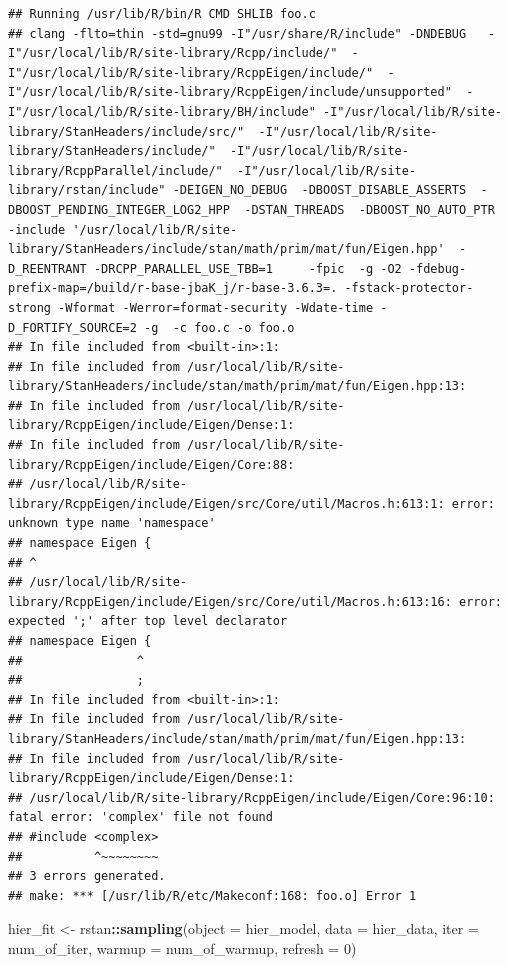 \documentclass[
]{article}
\newenvironment{Shaded}{\begin{snugshade}}{\end{snugshade}}
\newcommand{\DataTypeTok}[1]{\textcolor[rgb]{0.13,0.29,0.53}{#1}}
\newcommand{\DecValTok}[1]{\textcolor[rgb]{0.00,0.00,0.81}{#1}}
\newcommand{\KeywordTok}[1]{\textcolor[rgb]{0.13,0.29,0.53}{\textbf{#1}}}
\newcommand{\NormalTok}[1]{#1}
\newcommand{\OperatorTok}[1]{\textcolor[rgb]{0.81,0.36,0.00}{\textbf{#1}}}
\newcommand{\StringTok}[1]{\textcolor[rgb]{0.31,0.60,0.02}{#1}}
\begin{document}
\begin{verbatim}
## Running /usr/lib/R/bin/R CMD SHLIB foo.c
## clang -flto=thin -std=gnu99 -I"/usr/share/R/include" -DNDEBUG   -I"/usr/local/lib/R/site-library/Rcpp/include/"  -I"/usr/local/lib/R/site-library/RcppEigen/include/"  -I"/usr/local/lib/R/site-library/RcppEigen/include/unsupported"  -I"/usr/local/lib/R/site-library/BH/include" -I"/usr/local/lib/R/site-library/StanHeaders/include/src/"  -I"/usr/local/lib/R/site-library/StanHeaders/include/"  -I"/usr/local/lib/R/site-library/RcppParallel/include/"  -I"/usr/local/lib/R/site-library/rstan/include" -DEIGEN_NO_DEBUG  -DBOOST_DISABLE_ASSERTS  -DBOOST_PENDING_INTEGER_LOG2_HPP  -DSTAN_THREADS  -DBOOST_NO_AUTO_PTR  -include '/usr/local/lib/R/site-library/StanHeaders/include/stan/math/prim/mat/fun/Eigen.hpp'  -D_REENTRANT -DRCPP_PARALLEL_USE_TBB=1     -fpic  -g -O2 -fdebug-prefix-map=/build/r-base-jbaK_j/r-base-3.6.3=. -fstack-protector-strong -Wformat -Werror=format-security -Wdate-time -D_FORTIFY_SOURCE=2 -g  -c foo.c -o foo.o
## In file included from <built-in>:1:
## In file included from /usr/local/lib/R/site-library/StanHeaders/include/stan/math/prim/mat/fun/Eigen.hpp:13:
## In file included from /usr/local/lib/R/site-library/RcppEigen/include/Eigen/Dense:1:
## In file included from /usr/local/lib/R/site-library/RcppEigen/include/Eigen/Core:88:
## /usr/local/lib/R/site-library/RcppEigen/include/Eigen/src/Core/util/Macros.h:613:1: error: unknown type name 'namespace'
## namespace Eigen {
## ^
## /usr/local/lib/R/site-library/RcppEigen/include/Eigen/src/Core/util/Macros.h:613:16: error: expected ';' after top level declarator
## namespace Eigen {
##                ^
##                ;
## In file included from <built-in>:1:
## In file included from /usr/local/lib/R/site-library/StanHeaders/include/stan/math/prim/mat/fun/Eigen.hpp:13:
## In file included from /usr/local/lib/R/site-library/RcppEigen/include/Eigen/Dense:1:
## /usr/local/lib/R/site-library/RcppEigen/include/Eigen/Core:96:10: fatal error: 'complex' file not found
## #include <complex>
##          ^~~~~~~~~
## 3 errors generated.
## make: *** [/usr/lib/R/etc/Makeconf:168: foo.o] Error 1
\end{verbatim}

\begin{Shaded}
\begin{Highlighting}[]
\NormalTok{hier\_fit \textless{}{-}}\StringTok{ }\NormalTok{rstan}\OperatorTok{::}\KeywordTok{sampling}\NormalTok{(}\DataTypeTok{object =}\NormalTok{ hier\_model,}
                            \DataTypeTok{data =}\NormalTok{ hier\_data,}
                            \DataTypeTok{iter =}\NormalTok{ num\_of\_iter,}
                            \DataTypeTok{warmup =}\NormalTok{ num\_of\_warmup,}
                            \DataTypeTok{refresh =} \DecValTok{0}\NormalTok{)}
\end{Highlighting}
\end{Shaded}
\end{document}
